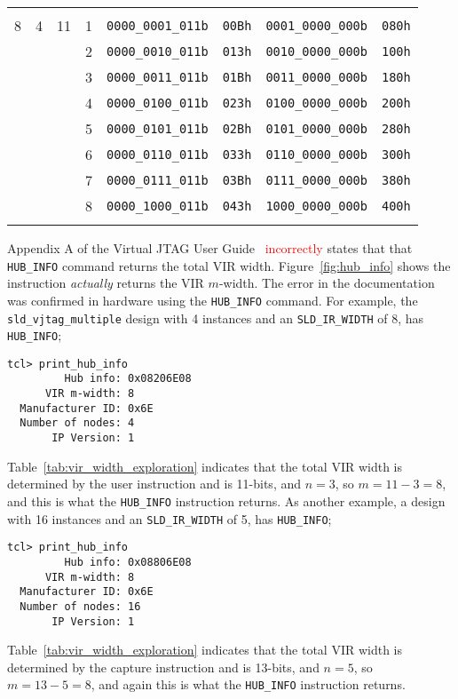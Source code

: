 \documentclass[10pt,twoside]{article}
\begin{document}
\begin{landscape}
\begin{table}
\begin{center}
\begin{tabular}{|c|c|c||c|r|r|r|r|}
&&&&&&&\\
8 & 4 & 11 & 1 & \verb+0000_0001_011b+ & \verb+00Bh+ & \verb+0001_0000_000b+ & \verb+080h+\\
  &   &    & 2 & \verb+0000_0010_011b+ & \verb+013h+ & \verb+0010_0000_000b+ & \verb+100h+\\
  &   &    & 3 & \verb+0000_0011_011b+ & \verb+01Bh+ & \verb+0011_0000_000b+ & \verb+180h+\\
  &   &    & 4 & \verb+0000_0100_011b+ & \verb+023h+ & \verb+0100_0000_000b+ & \verb+200h+\\
  &   &    & 5 & \verb+0000_0101_011b+ & \verb+02Bh+ & \verb+0101_0000_000b+ & \verb+280h+\\
  &   &    & 6 & \verb+0000_0110_011b+ & \verb+033h+ & \verb+0110_0000_000b+ & \verb+300h+\\
  &   &    & 7 & \verb+0000_0111_011b+ & \verb+03Bh+ & \verb+0111_0000_000b+ & \verb+380h+\\
  &   &    & 8 & \verb+0000_1000_011b+ & \verb+043h+ & \verb+1000_0000_000b+ & \verb+400h+\\
&&&&&&&\\
\hline
\end{tabular}
\end{center}
\end{table}
\end{landscape}

Appendix A of the Virtual JTAG User Guide~\cite{Altera_Virtual_JTAG_2008}
\textcolor{red}{incorrectly} states that that \verb+HUB_INFO+ command
returns the total VIR width. Figure~\ref{fig:hub_info} shows the
instruction {\em actually} returns the VIR $m$-width. The error in the documentation
was confirmed in hardware using the \verb+HUB_INFO+ command.
For example, the \verb+sld_vjtag_multiple+ design with 4 instances
and an \verb+SLD_IR_WIDTH+ of 8, has \verb+HUB_INFO+;
%
\begin{verbatim}
tcl> print_hub_info
         Hub info: 0x08206E08
      VIR m-width: 8
  Manufacturer ID: 0x6E
  Number of nodes: 4
       IP Version: 1
\end{verbatim}
%
Table~\ref{tab:vir_width_exploration} indicates that the total VIR width
is determined by the user instruction and is 11-bits, and $n=3$, so
$m=11-3=8$, and this is what the \verb+HUB_INFO+
instruction returns. As another example, a design with 16 instances
and an \verb+SLD_IR_WIDTH+ of 5, has \verb+HUB_INFO+;
%
\begin{verbatim}
tcl> print_hub_info
         Hub info: 0x08806E08
      VIR m-width: 8
  Manufacturer ID: 0x6E
  Number of nodes: 16
       IP Version: 1
\end{verbatim}
%
Table~\ref{tab:vir_width_exploration} indicates that the total VIR width
is determined by the capture instruction and is 13-bits, and $n=5$, so 
$m=13-5=8$, and again this is what the
\verb+HUB_INFO+ instruction returns. 
\end{document}

